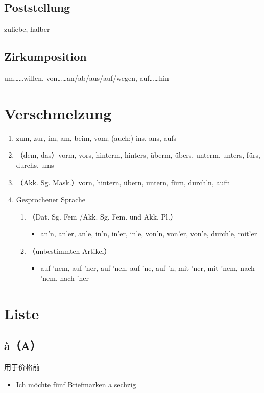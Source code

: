 \documentclass[UTF8]{report}
\begin{document}
\subsection{Poststellung}

zuliebe, halber

\subsection{Zirkumposition}
um……willen, von……an/ab/aus/auf/wegen, auf……hin


\section{Verschmelzung}
\begin{enumerate}
    \item zum, zur, im, am, beim, vom; (auch:) ins, ans, aufs
    \item （dem, das）vorm, vors, hinterm, hinters, überm, übers, unterm, unters, fürs, durchs, ums
    \item （Akk. Sg. Mask.）vorn, hintern, übern, untern, fürn, durch’n, aufn
    \item Gesprochener Sprache
    \begin{enumerate}
        \item （Dat. Sg. Fem /Akk. Sg. Fem. und Akk. Pl.）
        \begin{itemize}
            \item an’n, an’er, an’e, in’n, in’er, in’e, von’n, von’er, von’e, durch’e, mit’er
        \end{itemize}
        \item （unbestimmten Artikel）
        \begin{itemize}
            \item auf ’nem, auf ’ner, auf ’nen, auf ’ne, auf ’n, mit ’ner, mit ’nem, nach ’nem, nach ’ner
        \end{itemize}
    \end{enumerate}
\end{enumerate}




\section{Liste}

\subsection{à（A）}
用于价格前
\begin{itemize}
    \item Ich möchte fünf Briefmarken a sechzig
\end{itemize}
\end{document}
